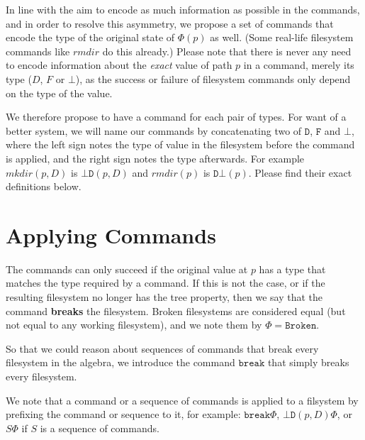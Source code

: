 \documentclass[12pt]{article}
\newcommand{\empt}{\bot}
\newcommand{\fsbroken}{\mathtt{Broken}}
\newcommand{\FS}{\Phi} %
\newcommand{\cbrk}{\mathtt{break}}
\newcommand{\fscommand}[2]{{#1#2}}
\newcommand{\fsregcommandchar}[1]{\mathtt{#1}}
\newcommand{\fsregcommand}[2]{\fscommand{\fsregcommandchar{#1}}{\fsregcommandchar{#2}}}
\newcommand{\cbd}{\fsregcommand{\empt}{D}}
\newcommand{\cdb}{\fsregcommand{D}{\empt}}
\theoremstyle{definition}
\begin{document}
In line with the aim to encode as much information as possible in the commands,
and in order to resolve this asymmetry, we propose a set of commands that encode
the type of the original state of $\FS(p)$ as well.
(Some real-life filesystem commands like $rmdir$ do this already.)
Please note that there is never any need to encode information about the
\emph{exact} value of path $p$ in a command, merely its type ($D$, $F$ or $\empt$),
as the success or failure of filesystem commands only depend on the type of the value.

We therefore propose to have a command for each pair of types.
For want of a better system, we will name our commands by concatenating
two of $\fsregcommandchar{D}$, $\fsregcommandchar{F}$ and $\fsregcommandchar{\empt}$, 
where the left sign notes the type of value
in the filesystem before the command is applied, and the right sign notes the type
afterwards. For example $mkdir(p,D)$ is $\cbd(p,D)$ and $rmdir(p)$ is $\cdb(p)$.
Please find their exact definitions below.


\section{Applying Commands}

The commands can only succeed if the original value at $p$ has a type that matches
the type required by a command. If this is not the case, or if the resulting
filesystem no longer has the tree property, then we say that the command
\textbf{breaks} the filesystem. Broken filesystems are considered equal
(but not equal to any working filesystem), and we note them by $\FS=\fsbroken$.

So that we could reason about sequences of commands that break every filesystem
in the algebra, we introduce the command $\cbrk$ that simply breaks every filesystem.

We note that a command or a sequence of commands is applied to a filsystem
by prefixing the command or sequence to it, for example: $\cbrk\FS$, $\cbd(p,D)\FS$, 
or $S\FS$ if $S$ is a sequence of commands.
\end{document}
